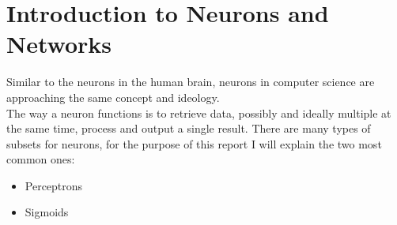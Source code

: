 
\section{Introduction to Neurons and Networks}
Similar to the neurons in the human brain, neurons in computer science are approaching the same concept and ideology.\\
The way a neuron functions is to retrieve data, possibly and ideally multiple at the same time, process and output a single result. There
are many types of subsets for neurons, for the purpose of this report I will explain the two most common ones:
\begin{itemize}
    \item Perceptrons
    \item Sigmoids
\end{itemize}

